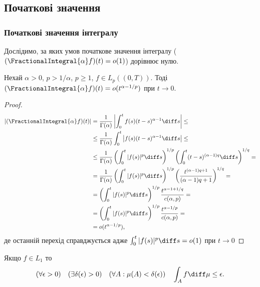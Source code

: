 \subsection{Початкові значення}

\subsubsection{Початкові значення інтегралу}

Дослідимо, за яких умов початкове значення інтегралу ($(\FractionalIntegral{\alpha} f)(t) = o(1)$) дорівнює нулю.

\begin{theorem}
    Нехай $\alpha > 0$, $p > 1 / \alpha$, $p \ge 1$, $f \in L_p((0, T))$. Тоді $(\FractionalIntegral{\alpha} f) (t) = o(t^{\alpha - 1 / p})$ при $t \to 0$.
\end{theorem}

\begin{proof}
    \begin{align*}
        \left| (\FractionalIntegral{\alpha} f) (t) \right| &= \frac{1}{\Gamma(\alpha)} \left| \int_0^t f(s) (t - s)^{\alpha - 1} \diff s \right| \le \\
        &\le \frac{1}{\Gamma(\alpha)}  \int_0^t \left| f(s) (t - s)^{\alpha - 1} \diff s \right| \le \\
        &\le \frac{1}{\Gamma(\alpha)} \left( \int_0^t |f(s)|^p \diff s \right)^{1/p} \left( \int_0^t (t - s)^{(\alpha - 1) q} \diff s \right)^{1/q} = \\
        &= \frac{1}{\Gamma(\alpha)} \left( \int_0^t |f(s)|^p \diff s \right)^{1/p} \left( \frac{t^{(\alpha - 1) q + 1}}{(\alpha - 1) q + 1} \right)^{1 / q} = \\
        &= \left( \int_0^t |f(s)|^p \diff s \right)^{1/p} \frac{t^{\alpha - 1 + 1 / q}}{c(\alpha, p)} = \\
        &= \left( \int_0^t |f(s)|^p \diff s \right)^{1/p} \frac{t^{\alpha - 1 / p}}{c(\alpha, p)} = \\
        &= o(t^{\alpha - 1 / p}),
    \end{align*}
    де останній перехід справджується адже $\int_0^t |f(s)|^p \diff s = o(1)$ при $t \to 0$
\end{proof}

\begin{remark}
    Якщо $f \in L_1$ то
    \begin{equation}
        (\forall \epsilon > 0) \quad (\exists \delta(\epsilon) > 0) \quad (\forall A: \mu(A) < \delta(\epsilon)) \quad \int_A f \diff \mu \le \epsilon.
    \end{equation}
\end{remark}

